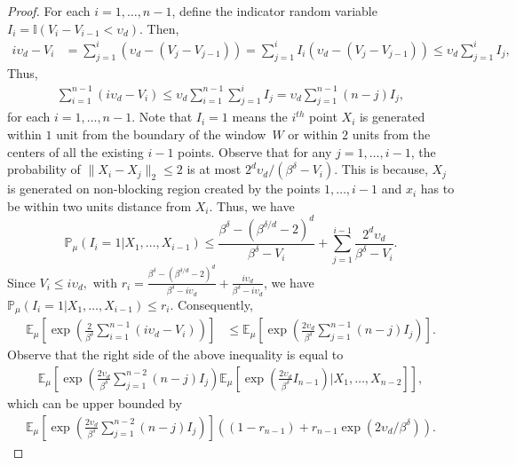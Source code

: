 \documentclass[10pt,a4paper]{amsart}
\newcommand{\ee}{\mathbb{E}}
\newcommand{\ind}{\mathbb{I}}
\newcommand{\lt}{\left}
\newcommand{\pp}{\mathbb{P}}
\newcommand{\rt}{\right}
\begin{document}
\begin{proof}
For each $i = 1, \dots, n-1$, define the indicator random variable
$I_i = \ind( V_{i} - V_{i-1} < \upsilon_d)$.
Then, 
\begin{align}
i\upsilon_d - V_{i} &= \sum_{j = 1}^{i} \lt(\upsilon_d - (V_{j} - V_{j-1}) \rt) =  \sum_{j =1}^i I_i\lt(\upsilon_d - (V_{j} - V_{j-1}) \rt) 
\leq {  \upsilon_d \sum_{j =1}^i I_j,}
\label{eqn:low_bdd_Bi}
\end{align}
Thus, 
\begin{align*}
\sum_{i =1}^{n-1} (i\upsilon_d - V_i) \leq \upsilon_d \sum_{i = 1}^{n-1} \sum_{j = 1}^i I_j = \upsilon_d \sum_{j = 1}^{n-1} (n - j) I_j,
\end{align*}
for each $i = 1,\dots, n-1$.
Note that $I_i = 1$ means the $i^{th}$ point $X_i$ is generated within $1$ unit from the boundary of the window~$W$ or within $2$ units from the centers of all the existing $i-1$ points. {  Observe that  for any $j =1, \dots, i-1$, the probability of $\|X_i - X_j\|_2 \leq 2$ is at most $2^d \upsilon_d/(\beta^{\delta} - V_i)$. This is because, $X_j$ is generated on non-blocking region created by the points $1, \dots, i-1$ and $x_i$ has to be within two units distance from $X_i$.} Thus, we have
\[
\pp_\mu \lt( I_i = 1 | X_1,\dots, X_{i-1}\rt) \leq 
\frac{\beta^{\delta} - (\beta^{\delta/d} - 2)^d}{\beta^{\delta} - V_i} + \sum_{j = 1}^{i-1} \frac{2^d \upsilon_d}{\beta^{\delta} - V_i}.
\]
Since $V_i \leq i \upsilon_d,$ with $r_i =  \frac{\beta^{\delta} - (\beta^{{\delta/d} } -2)^d}{\beta^{\delta} - i\upsilon_d} + \frac{i \upsilon_d}{\beta^{\delta} - i \upsilon_d}$, we have 
$\pp_\mu\lt( I_i = 1| X_1,\dots, X_{i-1}\rt) \leq r_i.$
Consequently,
\begin{align*}
\ee_\mu\lt[\exp\lt(\frac{2}{\beta^{\delta}}  \sum_{i =1}^{n-1} (i\upsilon_d - V_i)\rt)\rt] &\leq \ee_\mu\lt[\exp\lt(\frac{2 \upsilon_d}{\beta^{\delta}} \sum_{j = 1}^{n-1} (n - j) I_j \rt)\rt].
\end{align*}
Observe that the right side of the above inequality is equal to 
\begin{align*}
{  \ee_\mu\lt[\exp\lt(\frac{2 \upsilon_d}{\beta^{\delta}} \sum_{j = 1}^{n-2} (n - j) I_j \rt) \ee_\mu\lt[ \exp\lt(\frac{2 \upsilon_d}{\beta^{\delta}} I_{n-1} \rt)\big| X_1,\dots, X_{n-2}\rt]\rt]},
\end{align*}
which can be upper bounded by
\begin{align*}
\ee_\mu\lt[\exp\lt(\frac{2 \upsilon_d}{\beta^{\delta}} \sum_{j = 1}^{n-2} (n - j) I_j \rt) \rt] \lt((1 - r_{n-1}) + r_{n-1} \exp(2 \upsilon_d/\beta^{\delta}) \rt).

\end{align*}
\end{proof}
\end{document}
